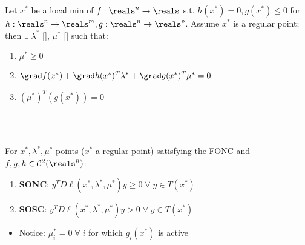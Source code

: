 \documentclass[12pt]{extarticle}
\begin{document}
~\\[-42pt]
\begin{whitebox}
     \\[4pt]
    Let $x^\ast$ be a local min of $f:\reals^n\to\reals$ s.t. $h(x^\ast)=0,g(x^\ast)\leq0$ for $h:\reals^n\to\reals^m,g:\reals^n\to\reals^p$. Assume $x^\ast$ is a regular point; then $\exists\;\lambda^\ast$ [], $\mu^\ast$ [] such that: \begin{enumerate}
        \item $\mu^\ast\geq0$
        \item $\grad f(x^\ast)+\grad h(x^\ast)^T\lambda^\ast+\grad g(x^\ast)^T\mu^\ast=0$\quad[i.e.$\grad_x\ell(x,\lambda,\mu)=0$]
        \item $(\mu^\ast)^T(g(x^\ast))=0$
    \end{enumerate}
\end{whitebox}

~\\[-28pt]
\begin{whitebox}
     \\[4pt]
    For $x^\ast,\lambda^\ast,\mu^\ast$ points ($x^\ast$ a regular point) satisfying the FONC
    and $f,g,h\in\mathcal{C}^2(\reals^n)$: \begin{enumerate}
        \item \textbf{SONC}: $y^TD\ell(x^\ast,\lambda^\ast,\mu^\ast)y\geq0\;\forall\;y\in T(x^\ast)$ 
        \item \textbf{SOSC}: \;$y^TD\ell(x^\ast,\lambda^\ast,\mu^\ast)y>0\;\forall\;y\in T(x^\ast)$ 
    \end{enumerate}
\end{whitebox}

\begin{itemize}
    \item Notice: $\mu_i^\ast=0\;\forall\;i$ for which $g_i(x^\ast)$ is active
\end{itemize}
\end{document}
